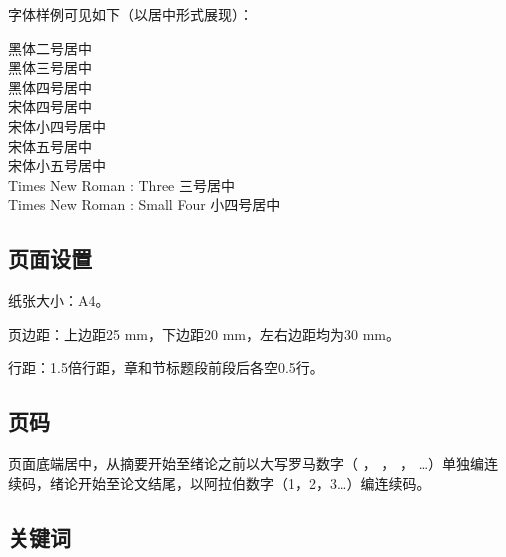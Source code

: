 字体样例可见如下（以居中形式展现）： \\



\begin{center}
    {\heiti{}黑体二号居中} \\

    {\heiti{}黑体三号居中} \\

    {\heiti{}黑体四号居中} \\

    {\songti{}宋体四号居中} \\

    {\songti{}宋体小四号居中} \\

    {\songti{}宋体五号居中} \\

    {\songti{}宋体小五号居中} \\

    { Times New Roman : Three} 三号居中 \\

    { Times New Roman : Small Four} 小四号居中 \\

\end{center}


\subsection{页面设置}

纸张大小：A4。

页边距：上边距25 mm，下边距20 mm，左右边距均为30 mm。

行距：1.5倍行距，章和节标题段前段后各空0.5行。

\subsection{页码}

页面底端居中，从摘要开始至绪论之前以大写罗马数字（
\uppercase\expandafter{} ，
\uppercase\expandafter{} ，
\uppercase\expandafter{} ，
…）单独编连续码，绪论开始至论文结尾，以阿拉伯数字（1，2，3…）编连续码。

\subsection{关键词}


